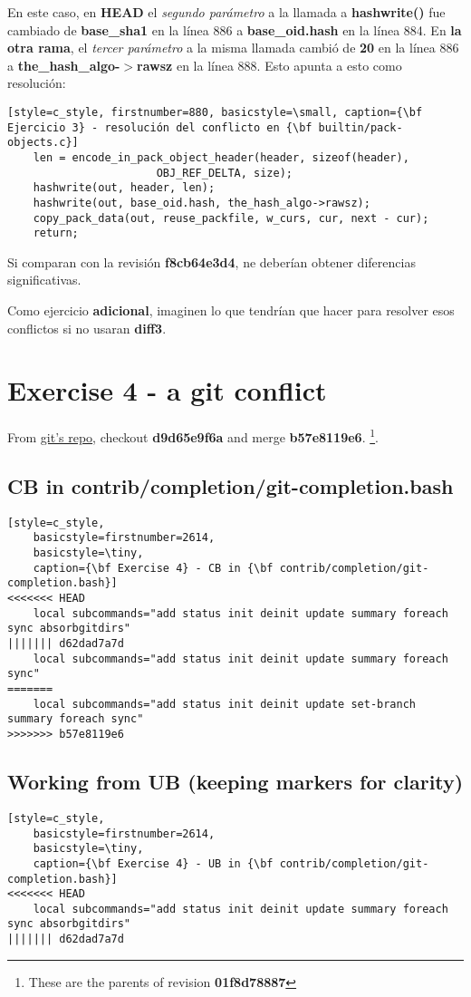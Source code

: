 En este caso, en {\bf HEAD} el {\it segundo parámetro} a la llamada a {\bf hashwrite()} fue cambiado de {\bf base\_sha1} en
la línea 886 a {\bf base\_oid.hash} en la línea 884. En {\bf la otra rama}, el {\it tercer parámetro} a la misma llamada
cambió de {\bf 20} en la línea 886 a {\bf the\_hash\_algo-$>$rawsz} en la línea 888. Esto apunta a esto como resolución:

\begin{lstlisting}[style=c_style, firstnumber=880, basicstyle=\small, caption={\bf Ejercicio 3} - resolución del conflicto en {\bf builtin/pack-objects.c}]
	len = encode_in_pack_object_header(header, sizeof(header),
					   OBJ_REF_DELTA, size);
	hashwrite(out, header, len);
	hashwrite(out, base_oid.hash, the_hash_algo->rawsz);
	copy_pack_data(out, reuse_packfile, w_curs, cur, next - cur);
	return;
\end{lstlisting}

Si comparan con la revisión {\bf f8cb64e3d4}, ne deberían obtener diferencias significativas.

Como ejercicio {\bf adicional},  imaginen lo que tendrían que hacer para resolver esos conflictos si no usaran {\bf diff3}.

\section{Exercise 4 - a git conflict}
\label{exercise_04}
From \hyperref[git_repo]{git's repo}, checkout {\bf d9d65e9f6a} and merge {\bf b57e8119e6}.
\footnote{These are the parents of revision {\bf 01f8d78887}}.

\subsection*{CB in contrib/completion/git-completion.bash}
\begin{lstlisting}[style=c_style,
	basicstyle=firstnumber=2614,
	basicstyle=\tiny,
	caption={\bf Exercise 4} - CB in {\bf contrib/completion/git-completion.bash}]
<<<<<<< HEAD
	local subcommands="add status init deinit update summary foreach sync absorbgitdirs"
||||||| d62dad7a7d
	local subcommands="add status init deinit update summary foreach sync"
=======
	local subcommands="add status init deinit update set-branch summary foreach sync"
>>>>>>> b57e8119e6
\end{lstlisting}

\subsection*{Working from {\bf UB} (keeping markers for clarity)}
\begin{lstlisting}[style=c_style,
	basicstyle=firstnumber=2614,
	basicstyle=\tiny,
	caption={\bf Exercise 4} - UB in {\bf contrib/completion/git-completion.bash}]
<<<<<<< HEAD
	local subcommands="add status init deinit update summary foreach sync absorbgitdirs"
||||||| d62dad7a7d
\end{lstlisting}

